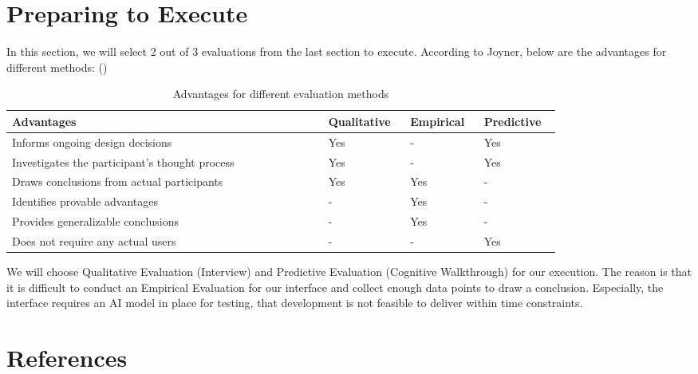 \documentclass[
	letterpaper, %
]{jdf}
\begin{document}
\section{Preparing to Execute}
In this section, we will select 2 out of 3 evaluations from the last section to execute. According to Joyner, below are the advantages for different methods: (\cite{joyner2016a})

\begin{table}[h] %
	\caption{Advantages for different evaluation methods}
	\small %
	\centering %
	\begin{tabular}{L{0.5\linewidth} L{0.1\linewidth} L{0.1\linewidth} L{0.1\linewidth}}
		\textbf{Advantages} & \textbf{Qualitative} & \textbf{Empirical} & \textbf{Predictive}\\
		\toprule[0.5pt]
		Informs ongoing design decisions & Yes & - & Yes \\
		\midrule
		Investigates the participant's thought process & Yes & - & Yes \\
		\midrule
		Draws conclusions from actual participants & Yes & Yes & - \\
		\midrule
		Identifies provable advantages & - & Yes & - \\
		\midrule
		Provides generalizable conclusions & - & Yes & - \\
		\midrule
		Does not require any actual users & - & - & Yes \\
	\end{tabular}
\end{table}

We will choose Qualitative Evaluation (Interview) and Predictive Evaluation (Cognitive Walkthrough) for our execution. The reason is that it is difficult to conduct an Empirical Evaluation for our interface and collect enough data points to draw a conclusion. Especially, the interface requires an AI model in place for testing, that development is not feasible to deliver within time constraints.

\section{References}
\printbibliography[heading=none]
\end{document}
